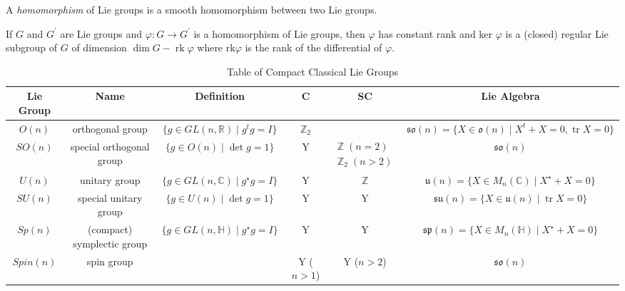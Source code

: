 \documentclass[11pt]{homework}
\begin{document}
\begin{definition}
    A \textit{homomorphism} of Lie groups is a smooth homomorphism between two Lie groups.
\end{definition}

\begin{theorem}
    If $G$ and $G^{\prime}$ are Lie groups and $\varphi: G \rightarrow G^{\prime}$ is a homomorphism of Lie groups, then $\varphi$ has constant rank and ker $\varphi$ is a (closed) regular Lie subgroup of $G$ of dimension $\operatorname{dim} G-\operatorname{rk} \varphi$ where $\mathrm{rk} \varphi$ is the rank of the differential of $\varphi .$
    \label{thm:rank}
\end{theorem}



\begin{sidewaystable}
    \centering
    \bgroup
    \def\arraystretch{1.5}
    \begin{tabular}{c|c|c|c|c|c}
    Lie Group & Name & Definition & C & SC & Lie Algebra \\ \hline
    $O(n)$ & orthogonal group & $\{g \in GL(n,\mathbb{R}) \mid g^tg=I\}$ & $\mathbb{Z}_2$ & & $\mathfrak{so}(n) = \{X \in \mathfrak{o}(n) \mid X^t + X = 0, \operatorname{tr} X = 0\}$ \\
    $SO(n)$ & special orthogonal group & $\{g \in O(n) \mid \det g = 1\}$ & Y & $\begin{aligned} \mathbb{Z} \; (n=2) \\ \mathbb{Z}_2 \; (n>2) \end{aligned}$ & $\mathfrak{so}(n)$ \\ 
    $U(n)$ & unitary group & $\{g \in GL(n,\mathbb{C}) \mid g^\star g=I\}$ & Y & $\mathbb{Z}$ & $\mathfrak{u}(n) = \{X \in M_n(\mathbb{C}) \mid X^\star + X = 0\}$ \\ 
    $SU(n)$ & special unitary group & $\{g \in U(n) \mid \det g = 1\}$ & Y & Y & $\mathfrak{su}(n) = \{X \in \mathfrak{u}(n) \mid \operatorname{tr} X = 0\}$ \\ 
    $Sp(n)$ & (compact) symplectic group & $\{g \in GL(n,\mathbb{H}) \mid g^\star g=I\}$ & Y & Y & $\mathfrak{sp}(n) = \{X \in M_n(\mathbb{H}) \mid X^\star + X = 0\}$ \\ 
    $Spin(n)$ & spin group &  & Y ($n>1$) & Y ($n>2$) & $\mathfrak{so}(n)$ 
    \end{tabular}
    \egroup
    \caption{Table of Compact Classical Lie Groups \cite{TableofL43:online}}
    
\end{sidewaystable}
\end{document}
